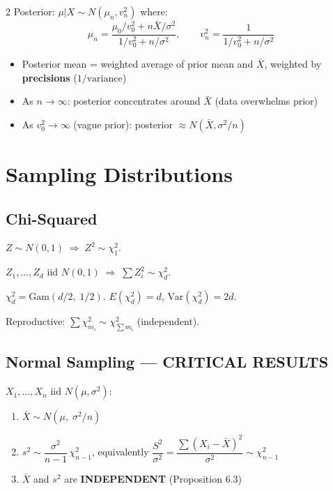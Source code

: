 \documentclass[8pt]{extarticle}
\begin{document}
\begin{multicols}{2}
Posterior: $\mu|X \sim N(\mu_n, v_n^2)$ where:
$$\mu_n = \frac{\mu_0/v_0^2 + n\bar X/\sigma^2}{1/v_0^2 + n/\sigma^2}, \qquad v_n^2 = \frac{1}{1/v_0^2 + n/\sigma^2}$$

\begin{itemize}
\item Posterior mean = weighted average of prior mean and $\bar X$, weighted by \textbf{precisions} ($1/\text{variance}$)
\item As $n\to\infty$: posterior concentrates around $\bar X$ (data overwhelms prior)
\item As $v_0^2\to\infty$ (vague prior): posterior $\approx N(\bar X, \sigma^2/n)$
\end{itemize}

\section{Sampling Distributions}

\subsection{Chi-Squared}

$Z \sim N(0,1) \;\Rightarrow\; Z^2 \sim \chi^2_1$.

$Z_1,\ldots,Z_d$ iid $N(0,1) \;\Rightarrow\; \sum Z_i^2 \sim \chi^2_d$.

$\chi^2_d = \text{Gam}(d/2,\; 1/2)$. \quad $E(\chi^2_d) = d$, \quad $\text{Var}(\chi^2_d) = 2d$.

Reproductive: $\sum \chi^2_{m_i} \sim \chi^2_{\sum m_i}$ (independent).

\subsection{Normal Sampling --- CRITICAL RESULTS}

$X_1,\ldots,X_n$ iid $N(\mu,\sigma^2)$:

\begin{enumerate}
\item $\bar X \sim N(\mu, \;\sigma^2/n)$
\item $s^2 \sim \dfrac{\sigma^2}{n-1}\,\chi^2_{n-1}$, \quad equivalently $\dfrac{S^2}{\sigma^2} = \dfrac{\sum(X_i-\bar X)^2}{\sigma^2} \sim \chi^2_{n-1}$
\item $\bar X$ and $s^2$ are \textbf{INDEPENDENT} (Proposition 6.3)
\end{enumerate}


\end{multicols}
\end{document}
